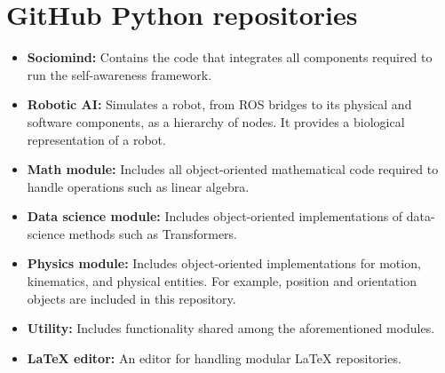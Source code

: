 \documentclass[a4paper]{article}
\title{}
\date{}
\author{Mohammad Rahmani}
\begin{document}
   \maketitle

   \section{GitHub Python repositories}
      \begin{itemize}
         \item \textbf{Sociomind:} Contains the code that integrates all components required to run the self-awareness framework. 
         \item \textbf{Robotic AI:} Simulates a robot, from ROS bridges to its physical and software components, as a hierarchy of nodes. It provides a biological representation of a robot. 
         \item \textbf{Math module:} Includes all object-oriented mathematical code required to handle operations such as linear algebra. 
         \item \textbf{Data science module:} Includes object-oriented implementations of data-science methods such as Transformers. 
         \item \textbf{Physics module:} Includes object-oriented implementations for motion, kinematics, and physical entities. For example, position and orientation objects are included in this repository. 
         \item \textbf{Utility:} Includes functionality shared among the aforementioned modules. 
         \item \textbf{LaTeX editor:} An editor for handling modular LaTeX repositories. 
      \end{itemize}
\end{document}
